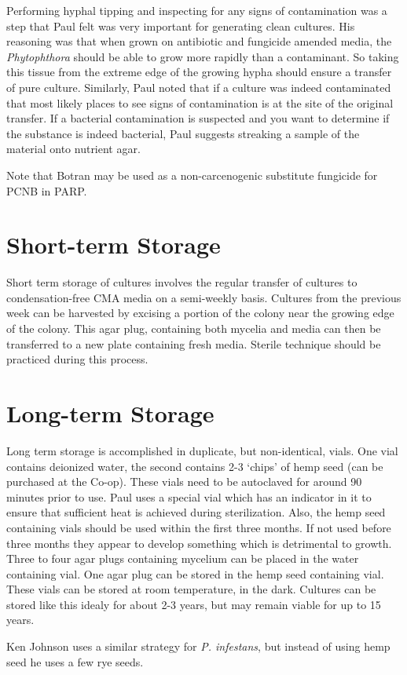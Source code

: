 \documentclass{article}\usepackage[]{graphicx}\usepackage[]{color}
\begin{document}
Performing hyphal tipping and inspecting for any signs of contamination was a step that Paul felt was very important for generating clean cultures.  His reasoning was that when grown on antibiotic and fungicide amended media, the \emph{Phytophthora} should be able to grow more rapidly than a contaminant.  So taking this tissue from the extreme edge of the growing hypha should ensure a transfer of pure culture.  Similarly, Paul noted that if a culture was indeed contaminated that most likely places to see signs of contamination is at the site of the original transfer.  If a bacterial contamination is suspected and you want to determine if the substance is indeed bacterial, Paul suggests streaking a sample of the material onto nutrient agar.

Note that Botran may be used as a non-carcenogenic substitute fungicide for PCNB in PARP.

\section{Short-term Storage}

Short term storage of cultures involves the regular transfer of cultures to condensation-free CMA media on a semi-weekly basis.  Cultures from the previous week can be harvested by excising a portion of the colony near the growing edge of the colony.  This agar plug, containing both mycelia and media can then be transferred to a new plate containing fresh media.  Sterile technique should be practiced during this process.

\section{Long-term Storage}

Long term storage is accomplished in duplicate, but non-identical, vials.  One vial contains deionized water, the second contains 2-3 `chips' of hemp seed (can be purchased at the Co-op).  These vials need to be autoclaved for around 90 minutes prior to use.  Paul uses a special vial which has an indicator in it to ensure that sufficient heat is achieved during sterilization.  Also, the hemp seed containing vials should be used within the first three months.  If not used before three months they appear to develop something which is detrimental to growth.  Three to four agar plugs containing mycelium can be placed in the water containing vial.  One agar plug can be stored in the hemp seed containing vial.  These vials can be stored at room temperature, in the dark.  Cultures can be stored like this idealy for about 2-3 years, but may remain viable for up to 15 years.

Ken Johnson uses a similar strategy for \emph{P. infestans}, but instead of using hemp seed he uses a few rye seeds.
% 
% 
% 
% 
% 

%
%
\end{document}

